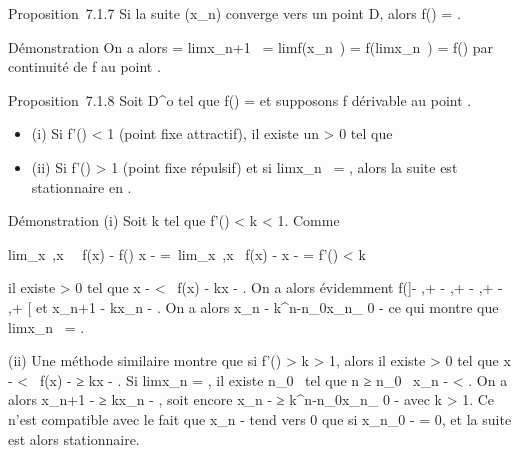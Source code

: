 \documentclass[]{article}
\begin{document}
Proposition~7.1.7 Si la suite (x_n) converge vers un point \ell \in
D, alors f(\ell) = \ell.

Démonstration On a alors \ell = limx_n+1~
= limf(x_n~) =
f(limx_n~) = f(\ell) par continuité de f
au point \ell.

Proposition~7.1.8 Soit \ell \in D^o tel que f(\ell) = \ell et supposons
f dérivable au point \ell.

\begin{itemize}
\itemsep1pt\parskip0pt
\item
  (i) Si f'(\ell) < 1 (point fixe attractif),
  il existe un \eta > 0 tel que

  \begin{itemize}
  \itemsep1pt\parskip0pt
  \item
    (a) f(]\ell - \eta,\ell + \eta[) \subset~]\ell - \eta,\ell + \ell - \eta,\ell + \eta[\right )
    \rigtharrow~ limx_n~ = \ell
  \end{itemize}
\item
  (ii) Si f'(\ell) > 1 (point fixe
  répulsif) et si limx_n~ = \ell, alors
  la suite est stationnaire en \ell.
\end{itemize}

Démonstration (i) Soit k tel que f'(\ell) < k
< 1. Comme

lim_x\rightarrow~\ell,x\neq~\ell~\left
 f(x) - f(\ell) \over x - \ell
\right  =\
lim_x\rightarrow~\ell,x\neq~\ell\left
 f(x) - \ell \over x - \ell \right
 = f'(\ell) < k

il existe \eta > 0 tel que x - \ell
< \eta \rigtharrow~f(x) - \ell\leq kx - \ell.
On a alors évidemment f(]\ell - \eta,\ell + \eta[) \subset~]\ell - \eta,\ell + \eta[\subset~ D'. Soit
n_0 tel que x_n_0 \in]\ell - \eta,\ell + \ell - \eta,\ell + \eta[ et
x_n+1 - \ell\leq kx_n -
\ell. On a alors x_n - \ell\leq
k^n-n_0x_n_ 0 -
\ell ce qui montre que limx_n~
= \ell.

(ii) Une méthode similaire montre que si f'(\ell)
> k > 1, alors il existe \eta > 0
tel que x - \ell < \eta \rigtharrow~f(x) -
\ell≥ kx - \ell. Si
limx_n = \ell, il existe n_0~
tel que n ≥ n_0 \rigtharrow~x_n - \ell
< \eta. On a alors x_n+1 - \ell≥
kx_n - \ell, soit encore
x_n - \ell≥
k^n-n_0x_n_ 0 -
\ell avec k > 1. Ce n'est compatible avec le fait
que x_n - \ell tend vers 0 que si x_n_0 - \ell = 0,
et la suite est alors stationnaire.
\end{document}
